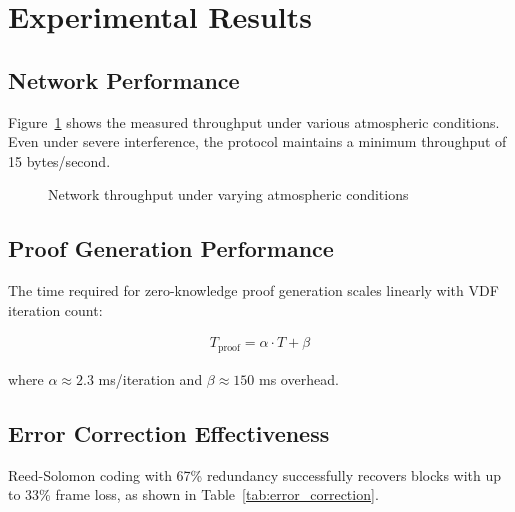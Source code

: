 \documentclass[11pt,a4paper]{article}
\begin{document}
\section{Experimental Results}

\subsection{Network Performance}

Figure~\ref{fig:throughput} shows the measured throughput under various atmospheric conditions. Even under severe interference, the protocol maintains a minimum throughput of 15 bytes/second.

\begin{figure}[h]
\centering
{}
\caption{Network throughput under varying atmospheric conditions}
\label{fig:throughput}
\end{figure}

\subsection{Proof Generation Performance}

The time required for zero-knowledge proof generation scales linearly with VDF iteration count:

\begin{align}
T_{\text{proof}} = \alpha \cdot T + \beta
\end{align}

where $\alpha \approx 2.3$ ms/iteration and $\beta \approx 150$ ms overhead.

\subsection{Error Correction Effectiveness}

Reed-Solomon coding with 67\% redundancy successfully recovers blocks with up to 33\% frame loss, as shown in Table~\ref{tab:error_correction}.
\end{document}
